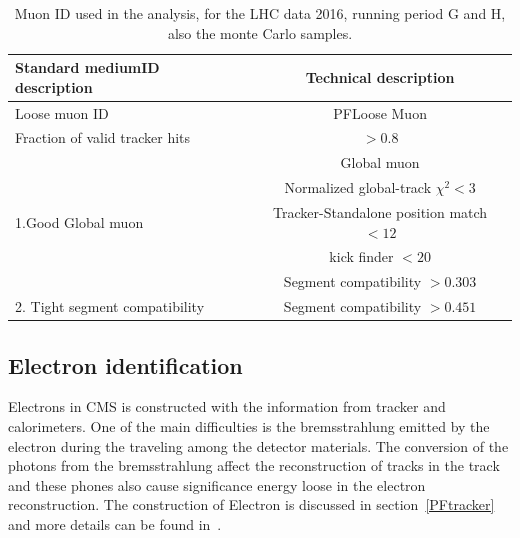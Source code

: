\begin{table}[!tpb]
\caption{Muon ID used in the analysis, for the LHC data 2016, running period G and H, also the monte Carlo samples.  \label{tbl:standardMedID}}
\label{tab:antil}
\begin{center}
\begin{tabular}{|l|c|}   
\hline
Standard mediumID description                    &  Technical description\\\hline
Loose muon ID                               & PFLoose Muon\\\hline
Fraction of valid tracker hits           & $>0.8$ \\\hline
\multirow{5}{*}{1.Good Global muon}                      &Global muon\\\cline{2-2}
                                                                        &Normalized global-track $\chi^{2}<3$\\\cline{2-2}
                                                                        &Tracker-Standalone position match $< 12$\\\cline{2-2}
                                                                        &kick finder $< 20$ \\\cline{2-2}
                                                                        &Segment compatibility $> 0.303$ \\\hline                                                                       
\hline
2. Tight segment compatibility      & Segment compatibility $>0.451$\\\hline
\end{tabular}
\end{center}
\end{table}


\subsection{Electron identification}

Electrons in CMS is constructed with the information from tracker and calorimeters. One of the main difficulties is the bremsstrahlung emitted by the electron during the traveling among the detector materials. The conversion of the photons from the bremsstrahlung affect the reconstruction of tracks in the track and these phones also cause significance energy loose in the electron reconstruction. The construction of Electron is discussed in section~\ref{PFtracker} and more details can be found in~\cite{electron_reco2015}. 


